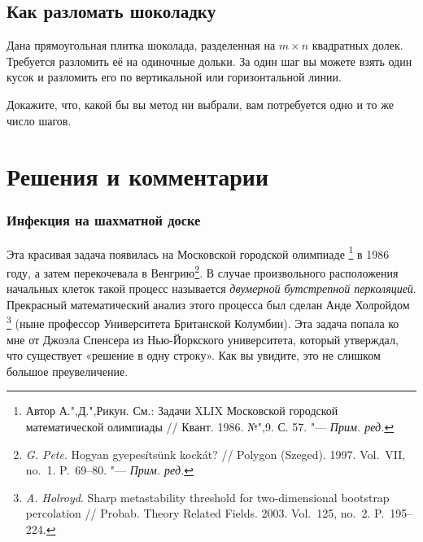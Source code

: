 \documentclass[twoside]{book}
\makeatletter
\newcommand{\rindex}[2][\imki@jobname]{%
\index[#1]{\detokenize{#2}}%
}
\makeatother
\begin{document}
\subsection*{Как разломать шоколадку}%
\rindex{Как разломать шоколадку}

Дана прямоугольная плитка шоколада, разделенная на $m\times n$ квадратных долек. 
Требуется разломить её на одиночные дольки.
За один шаг вы можете взять один кусок и разломить его по вертикальной или горизонтальной линии.


Докажите, что, какой бы вы метод ни выбрали, вам потребуется одно и то же  число шагов.



\section*{Решения и комментарии}

\subsubsection*{Инфекция на шахматной доске}%


Эта красивая задача появилась на Московской городской олимпиаде%
\footnote{Автор А.",Д.",Рикун. См.: Задачи XLIX Московской городской математической олимпиады /\!/ {Квант}. 1986. №",9. С. 57. "--- \emph{Прим. ред.}} в 1986 году,
а затем перекочевала в Венгрию\footnote{\emph{G. Pete}. Hogyan gyepesítsünk kockát? /\!/ {Polygon (Szeged)}. 1997. Vol.~VII, no.~1. P.~69--80. "--- \emph{Прим. ред.}}.
В случае произвольного расположения начальных клеток такой процесс называется \emph{двумерной бутстрепной перколяцией}.
Прекрасный математический анализ этого процесса был сделан Анде Холройдом%
\footnote{\emph{A. Holroyd}. Sharp metastability threshold for two-dimensional bootstrap percolation /\!/ {Probab. Theory Related Fields}. 2003. Vol.~125, no.~2. P.~195--224.} (ныне профессор Университета Британской Колумбии).
Эта задача попала ко мне от Джоэла Спенсера %
из Нью-Йоркского университета, который утверждал, что существует «решение в одну строку».
Как вы увидите, это не слишком большое преувеличение.


\end{document}
